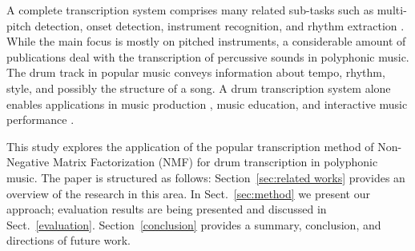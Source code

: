 \documentclass{article}
\begin{document}

A complete transcription system comprises many related sub-tasks such as multi-pitch detection, onset detection, instrument recognition, and rhythm extraction \cite{Benetos2013}. While the main focus is mostly on pitched instruments, a considerable amount of publications deal with the transcription of percussive sounds in polyphonic music. The drum track in popular music conveys information about tempo, rhythm, style, and possibly the structure of a song. A drum transcription system alone enables applications in music production \cite{Yoshii2007a}, music education, and interactive music performance \cite{Weinberg2009}.


This study explores the application of the popular transcription method of Non-Negative Matrix Factorization (NMF) for drum transcription in polyphonic music. The paper is structured as follows: Section~\ref{sec:related works} provides an overview of the research in this area. In Sect.~\ref{sec:method} we present our approach; evaluation results are being presented and discussed in Sect.~\ref{evaluation}. Section~\ref{conclusion} provides a summary, conclusion, and directions of future work.

\end{document}
